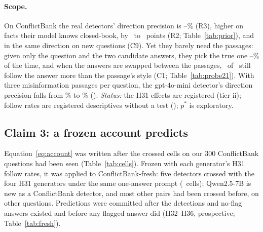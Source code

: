 \paragraph{Scope.}
On ConflictBank the real detectors' direction precision is \ssPrecMin--\ssPrecMax\% (R3), higher on facts their
model knows closed-book, by \priorSsDiffMin\ to \priorSsDiffMax\ points (R2; Table~\ref{tab:prior}), and in the same
direction on new questions (C9). Yet they
barely need the passages: given only the question and the two candidate answers, they pick the true one
\cxAoMin--\cxAoMax\% of the time, and when the answers are swapped between the passages, \cxSwapSurviveN\ of
\cxProbeN\ still follow the answer more than the passage's style (C1; Table~\ref{tab:probe21}). With three
misinformation passages per question, the gpt-4o-mini detector's direction precision falls from \cbDirAccLlm\% to
\cbmajDirAccLlm\% (). \emph{Status:} the H31 effects are registered (tier ii); follow rates are
registered descriptives without a test (); $p^*$ is exploratory.

\subsection{Claim 3: a frozen account predicts}
\label{sec:real}

Equation~\eqref{eq:account} was written after the crossed cells on our 300 ConflictBank questions had been seen
(Table~\ref{tab:cells}). Frozen with each generator's H31 follow rates, it was applied to ConflictBank-fresh: five
detectors crossed with the four H31 generators under the same one-answer prompt (\frN\ cells); Qwen2.5-7B is new as a
ConflictBank detector, and most other pairs had been crossed before, on other questions. Predictions were committed after the
detections and no-flag answers existed and before any flagged answer did (H32--H36, prospective;
Table~\ref{tab:fresh}).

